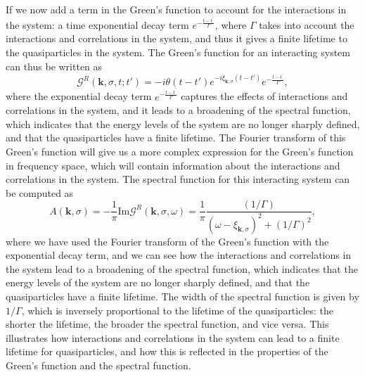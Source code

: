 If we now add a term in the Green's function to account for the interactions in the system: a time exponential decay term \(e^{-\frac{t-t^{\prime}}{\Gamma}}\), where \(\Gamma\) takes into account the interactions and correlations in the system, and thus it gives a finite lifetime to the quasiparticles in the system. The Green's function for an interacting system can thus be written as
\[
    \mathcal{G}^R(\mathbf{k}, \sigma, t; t') = -i \theta(t - t') e^{-i \xi_{\mathbf{k}, \sigma} (t - t')} e^{-\frac{t-t^{\prime}}{\Gamma}},
\]
where the exponential decay term \(e^{-\frac{t-t^{\prime}}{\Gamma}}\) captures the effects of interactions and correlations in the system, and it leads to a broadening of the spectral function, which indicates that the energy levels of the system are no longer sharply defined, and that the quasiparticles have a finite lifetime. The Fourier transform of this Green's function will give us a more complex expression for the Green's function in frequency space, which will contain information about the interactions and correlations in the system. The spectral function for this interacting system can be computed as
\[
    A(\mathbf{k}, \sigma) = -\frac{1}{\pi} \mathrm{Im} \mathcal{G}^R(\mathbf{k}, \sigma, \omega) = \frac{1}{\pi} \frac{(1/\Gamma)}{(\omega - \xi_{\mathbf{k}, \sigma})^2 + (1/\Gamma)^2},
\]
where we have used the Fourier transform of the Green's function with the exponential decay term, and we can see how the interactions and correlations in the system lead to a broadening of the spectral function, which indicates that the energy levels of the system are no longer sharply defined, and that the quasiparticles have a finite lifetime. The width of the spectral function is given by \(1/\Gamma\), which is inversely proportional to the lifetime of the quasiparticles: the shorter the lifetime, the broader the spectral function, and vice versa. This illustrates how interactions and correlations in the system can lead to a finite lifetime for quasiparticles, and how this is reflected in the properties of the Green's function and the spectral function.

